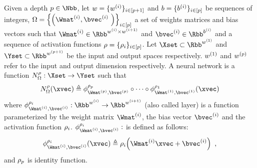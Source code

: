 \begin{definition} \label{definition:ch2-neural_networks}
  Given a depth $\depth \in \Nbb$, 
  let $w = \{ w^{(i)} \}_{i \in [p+1]}$ and $b = \{ b^{(i)} \}_{i \in [p]}$ be sequences of integers, $\weights = \left\{ \left( \Wmat^{(i)}, \bvec^{(i)} \right) \right\}_{i \in [\depth]}$ a set of weights matrices and bias vectors 
  such that $\Wmat^{(i)} \in \Rbb^{\dimw^{(i)} \times \dimw^{(i+1)}}$ and $\bvec^{(i)} \in \Rbb^{\dimb^{(i)}}$ and a sequence of activation functions $\rho = \{\rho_i \}_{i \in [p]}$.
  Let $\Xset \subset \Rbb^{\dimw^{(1)}}$ and $\Yset \subset \Rbb^{\dimw^{(\depth+1)}}$ be the input and output spaces respectively.
	$w^{(1)}$ and $w^{(p)}$ refer to the input and output dimension respectively.
  A neural network is a function $\nn^\act_\weights : \Xset \rightarrow \Yset$ such that
  \begin{equation}
    \nn^\act_{\weights}(\xvec) \triangleq \layer^{\act_\depth}_{\Wmat^{(\depth)}, \bvec^{(\depth)}} \circ \cdots \circ \layer^{\act_1}_{\Wmat^{(1)}, \bvec^{(1)}}(\xvec)
  \end{equation}
  where $\layer^{\act_i}_{\Wmat^{(i)},\bvec^{(i)}}: \Rbb^{w^{(i)}} \rightarrow \Rbb^{w^{(i+1)}}$ (also called layer) is a function parameterized by the weight matrix $\Wmat^{(i)}$, the bias vector $\bvec^{(i)}$ and the activation function $\rho_i$.
  $\layer^{\act_i}_{\Wmat^{(i)},\bvec^{(i)}}:$  is defined as follows: 
  \begin{equation}
    \layer^{\act_i}_{\Wmat^{(i)},\bvec^{(i)}} (\xvec) \triangleq \act_i \left(\Wmat^{(i)}\xvec + \bvec^{(i)}\right) \enspace,
  \end{equation}
  and $\rho_p$ is identity function.
\end{definition}

